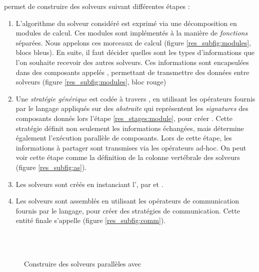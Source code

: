 \posl{} permet de construire des solveurs suivant différentes étapes : 
\begin{enumerate}
\item  L'algorithme du solveur considéré est  exprimé via une décomposition  en modules de calcul. Ces modules sont implémentés à la   manière de {\it fonctions} séparées. Nous appelons \INTROom{} ces morceaux de calcul (figure \ref{res_subfig:modules}, blocs bleus). En suite, il faut décider  quelles  sont les  types d'informations que l'on souhaite  recevoir des autres solveurs.  Ces informations sont encapsulées  dans des composants appelés  \INTROopch{},  permettant  de transmettre  des  données entre solveurs (figure \ref{res_subfig:modules}, bloc rouge) \label{res_stages:module}

\item  Une {\it stratégie générique}  est codée  à travers  \posl{}, en utilisant les  opérateurs fournis par le langage appliqués  sur des \ms{} \textit{abstraite} qui représentent les \textit{signatures} des composants donnés lors l'étape \ref{res_stages:module}, pour créer \INTROass. Cette stratégie définit non seulement les informations échangées, mais détermine également l'exécution parallèle de composants. Lors  de cette  étape, les informations à partager sont  transmises via les opérateurs  ad-hoc. On peut voir cette étape comme la définition de la colonne vertébrale des solveurs (figure \ref{res_subfig:as}).

\item  Les solveurs sont créés en instanciant l'\as, par \oms{} et \opch. %

\item Les solveurs sont assemblés en utilisant les opérateurs de communication fournis par le langage, pour créer des stratégies de communication. Cette entité finale s'appelle \INTROsoset{} (figure \ref{res_subfig:comm}).
\end{enumerate}

\begin{figure}
	\centering
	\\
	\\
	\caption[]{Construire des solveurs parallèles avec \posl{}}
	\label{res_fig:posl}
\end{figure}%

